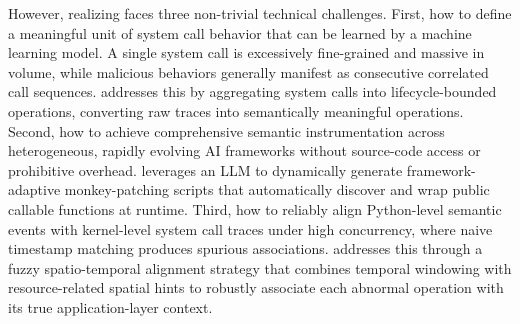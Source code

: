 However, realizing \toolname{} faces three non-trivial technical challenges. First, how to define a meaningful unit of system call behavior that can be learned by a machine learning model. A single system call is excessively fine-grained and massive in volume, while malicious behaviors generally manifest as consecutive correlated call sequences\cite{3677893,jcp6030099}. \toolname{} addresses this by aggregating system calls into lifecycle-bounded operations, converting raw traces into semantically meaningful operations.
Second, how to achieve comprehensive semantic instrumentation across heterogeneous, rapidly evolving AI frameworks without source-code access or prohibitive overhead. \toolname{} leverages an LLM to dynamically generate framework-adaptive monkey-patching scripts that automatically discover and wrap public callable functions at runtime.
Third, how to reliably align Python-level semantic events with kernel-level system call traces under high concurrency, where naive timestamp matching produces spurious associations. \toolname{} addresses this through a fuzzy spatio-temporal alignment strategy that combines temporal windowing with resource-related spatial hints to robustly associate each abnormal operation with its true application-layer context.




